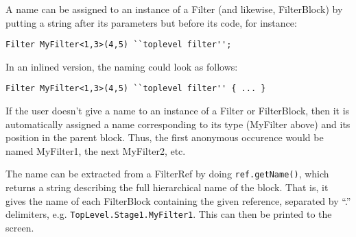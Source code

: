 \documentclass[draft]{article}
\begin{document}
A name can be assigned to an instance of a Filter (and likewise,
FilterBlock) by putting a string after its parameters but before its
code, for instance:

\begin{verbatim}
Filter MyFilter<1,3>(4,5) ``toplevel filter'';
\end{verbatim}

In an inlined version, the naming could look as follows:

\begin{verbatim}
Filter MyFilter<1,3>(4,5) ``toplevel filter'' { ... }
\end{verbatim}

If the user doesn't give a name to an instance of a Filter or
FilterBlock, then it is automatically assigned a name corresponding to
its type (MyFilter above) and its position in the parent block.  Thus,
the first anonymous occurence would be named MyFilter1, the next
MyFilter2, etc.

The name can be extracted from a FilterRef by doing
{\tt ref.getName()}, which returns a string describing the full
hierarchical name of the block.  That is, it gives the name of each
FilterBlock containing the given reference, separated by ``.''
delimiters, e.g. {\tt TopLevel.Stage1.MyFilter1}.  This can then be
printed to the screen.
\end{document}
